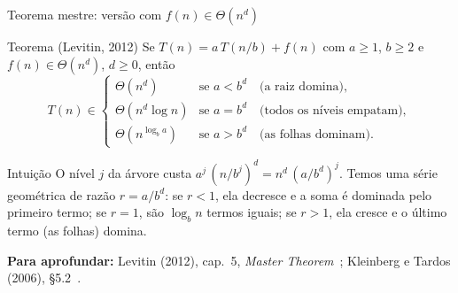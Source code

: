 \documentclass[aspectratio=169,xcolor=table]{beamer}
\newcommand{\fonte}[1]{%
  \vfill
  {\tiny\color{gray!55!black}\textbf{Para aprofundar:} #1\par}%
}
\begin{document}
\begin{frame}{Teorema mestre: versão com $f(n)\in\Theta(n^d)$}
  \begin{block}{Teorema (Levitin, 2012)}
    \scriptsize Se $T(n)=a\,T(n/b)+f(n)$ com $a\ge 1$, $b\ge 2$ e $f(n)\in\Theta(n^d)$, $d\ge 0$, então
    \[
      T(n)\in
      \begin{cases}
        \Theta(n^d)            & \text{se } a < b^d \quad\text{(a raiz domina)},\\
        \Theta(n^d \log n)     & \text{se } a = b^d \quad\text{(todos os níveis empatam)},\\
        \Theta(n^{\log_b a})   & \text{se } a > b^d \quad\text{(as folhas dominam)}.
      \end{cases}
    \]
  \end{block}
  \begin{exampleblock}{Intuição}
    \scriptsize O nível $j$ da árvore custa $a^j\,(n/b^j)^d = n^d\,(a/b^d)^j$.
    Temos uma série geométrica de razão $r=a/b^d$: se $r<1$, ela
    decresce e a soma é dominada pelo primeiro termo; se $r=1$, são
    $\log_b n$ termos iguais; se $r>1$, ela cresce e o último termo
    (as folhas) domina.
  \end{exampleblock}
  \fonte{Levitin (2012), cap.~5, \emph{Master Theorem}~\cite{levitin2012introduction};
    Kleinberg e Tardos (2006), \S 5.2~\cite{kleinberg2006algorithm}.}
\end{frame}
\end{document}
